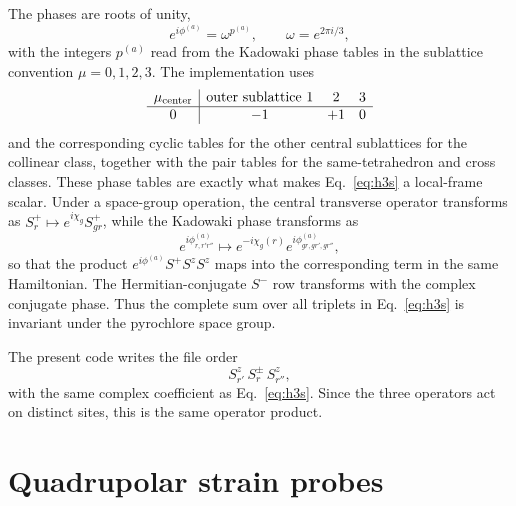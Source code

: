 \documentclass[11pt]{article}
\begin{document}
The phases are roots of unity,
\begin{equation}
  e^{i\phi^{(a)}}=\omega^{p^{(a)}},
  \qquad
  \omega=e^{2\pi i/3},
\end{equation}
with the integers $p^{(a)}$ read from the Kadowaki phase tables in the
sublattice convention $\mu=0,1,2,3$.  The implementation uses
\begin{equation}
\begin{array}{c|ccc}
\mu_{\rm center} & \text{outer sublattice }1 & 2 & 3 \\ \hline
0 & -1 & +1 & 0
\end{array}
\end{equation}
and the corresponding cyclic tables for the other central sublattices for the
collinear class, together with the pair tables for the same-tetrahedron and
cross classes.  These phase tables are exactly what makes
Eq.~\eqref{eq:h3s} a local-frame scalar.  Under a space-group operation, the
central transverse operator transforms as
$S^+_r\mapsto e^{i\chi_g}S^+_{g r}$, while the Kadowaki phase transforms as
\begin{equation}
  e^{i\phi^{(a)}_{r,r'r''}}
  \mapsto
  e^{-i\chi_g(r)} e^{i\phi^{(a)}_{g r,g r',g r''}},
\end{equation}
so that the product
$e^{i\phi^{(a)}}S^+S^zS^z$ maps into the corresponding term in the same
Hamiltonian.  The Hermitian-conjugate $S^-$ row transforms with the complex
conjugate phase.  Thus the complete sum over all triplets in
Eq.~\eqref{eq:h3s} is invariant under the pyrochlore space group.

The present code writes the file order
\begin{equation}
  S^z_{r'}\,S^\pm_{r}\,S^z_{r''},
\end{equation}
with the same complex coefficient as Eq.~\eqref{eq:h3s}.  Since the three
operators act on distinct sites, this is the same operator product.

\section{Quadrupolar strain probes}
\end{document}
